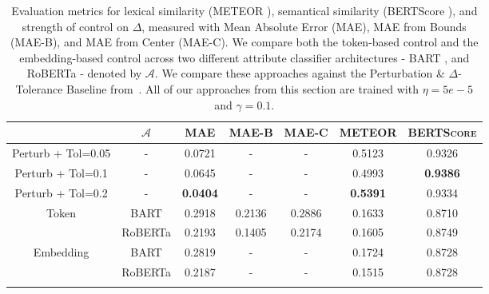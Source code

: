 \begin{table}[]
\centering
\small
\caption{Evaluation metrics for lexical similarity (METEOR \citep{lavie-agarwal-2007-meteor}), semantical similarity (BERTScore \citep{zhang2019bertscore}), and strength of control on $\Delta$, measured with Mean Absolute Error (MAE), MAE from Bounds (MAE-B), and MAE from Center (MAE-C). We compare both the token-based control and the embedding-based control across two different attribute classifier architectures - BART \citep{lewis2019bart}, and RoBERTa \citep{liu2019roberta} - denoted by $\mathcal{A}$. We compare these approaches against the Perturbation \& $\Delta$-Tolerance Baseline from~. All of our approaches from this section are trained with $\eta=5e-5$ and $\gamma=0.1$.}
\label{tab:ac_model_variation}

\begin{tabularx}{\linewidth}{@{\extracolsep{\fill}} ccccccc}
\toprule[1.5pt]
                               & $\mathcal{A}$   & \textsc{MAE}    & \textsc{MAE-B} & \textsc{MAE-C} & \textsc{METEOR} & \textsc{BERTScore} \\
\midrule[0.75pt]
Perturb + Tol=0.05             & -               & 0.0721          & -              & -              & 0.5123          & 0.9326 \\
Perturb + Tol=0.1              & -               & 0.0645          & -              & -              & 0.4993          & \textbf{0.9386} \\
Perturb + Tol=0.2              & -               & \textbf{0.0404} & -              & -              & \textbf{0.5391} & 0.9334 \\
\midrule[0.75pt]
\multicolumn{1}{c}{Token}      & BART            & 0.2918          & 0.2136          & 0.2886          & 0.1633          & 0.8710  \\
                               & RoBERTa         & 0.2193          & 0.1405          & 0.2174          & 0.1605          & 0.8749  \\
\midrule[0.75pt]
\multicolumn{1}{c}{Embedding}  & BART            & 0.2819          & -              & -              & 0.1724          & 0.8728  \\
                               & RoBERTa         & 0.2187          & -              & -              & 0.1515          & 0.8728  \\
  \bottomrule[1.5pt]\\
\end{tabularx}
\end{table}

